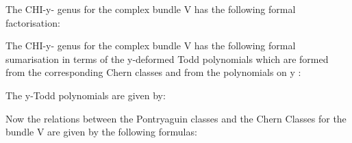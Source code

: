 \documentclass[a4paper,a4paper]{article}
\begin{document}
\begin{center}
{  \coordHE{} }
\end{center}
The  CHI-y- genus for the complex bundle V has the following formal factorisation:
\begin{center}
{  \coordHE{} }
\end{center}

The CHI-y- genus for the complex bundle V has the following formal sumarisation in terms of the y-deformed Todd polynomials which are formed from the corresponding Chern classes and from the polynomials on y :
\begin{center}
{  \coordHE{} }
\end{center}

The y-Todd  polynomials are given by:
\begin{center}
{  \coordHE{} }
\end{center}
\begin{center}
{  \coordHE{} }
\end{center}
\begin{center}
{  \coordHE{} }
\end{center}
\begin{center}
{  \coordHE{} }
\end{center}
\begin{center}
{  \coordHE{} }
\end{center}

Now the relations between the Pontryaguin classes and the Chern Classes for the bundle V are given by the following formulas:

\begin{center}
{  \coordHE{} }
\end{center}
\end{document}
